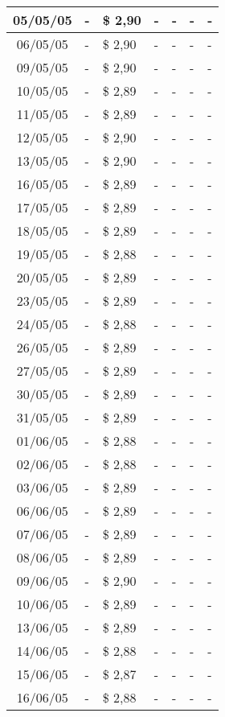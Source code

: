\begin{center}
\begin{longtable}{|c|p{1.5cm}|p{1.5cm}|p{1.5cm}|p{1.5cm}|p{1.5cm}|p{1.5cm}|}
05/05/05 & - & \$ 2,90 & - & - & - & - \\ \hline
06/05/05 & - & \$ 2,90 & - & - & - & - \\ \hline
09/05/05 & - & \$ 2,90 & - & - & - & - \\ \hline
10/05/05 & - & \$ 2,89 & - & - & - & - \\ \hline
11/05/05 & - & \$ 2,89 & - & - & - & - \\ \hline
12/05/05 & - & \$ 2,90 & - & - & - & - \\ \hline
13/05/05 & - & \$ 2,90 & - & - & - & - \\ \hline
16/05/05 & - & \$ 2,89 & - & - & - & - \\ \hline
17/05/05 & - & \$ 2,89 & - & - & - & - \\ \hline
18/05/05 & - & \$ 2,89 & - & - & - & - \\ \hline
19/05/05 & - & \$ 2,88 & - & - & - & - \\ \hline
20/05/05 & - & \$ 2,89 & - & - & - & - \\ \hline
23/05/05 & - & \$ 2,89 & - & - & - & - \\ \hline
24/05/05 & - & \$ 2,88 & - & - & - & - \\ \hline
26/05/05 & - & \$ 2,89 & - & - & - & - \\ \hline
27/05/05 & - & \$ 2,89 & - & - & - & - \\ \hline
30/05/05 & - & \$ 2,89 & - & - & - & - \\ \hline
31/05/05 & - & \$ 2,89 & - & - & - & - \\ \hline
01/06/05 & - & \$ 2,88 & - & - & - & - \\ \hline
02/06/05 & - & \$ 2,88 & - & - & - & - \\ \hline
03/06/05 & - & \$ 2,89 & - & - & - & - \\ \hline
06/06/05 & - & \$ 2,89 & - & - & - & - \\ \hline
07/06/05 & - & \$ 2,89 & - & - & - & - \\ \hline
08/06/05 & - & \$ 2,89 & - & - & - & - \\ \hline
09/06/05 & - & \$ 2,90 & - & - & - & - \\ \hline
10/06/05 & - & \$ 2,89 & - & - & - & - \\ \hline
13/06/05 & - & \$ 2,89 & - & - & - & - \\ \hline
14/06/05 & - & \$ 2,88 & - & - & - & - \\ \hline
15/06/05 & - & \$ 2,87 & - & - & - & - \\ \hline
16/06/05 & - & \$ 2,88 & - & - & - & - \\ \hline

\end{longtable}
\end{center}
